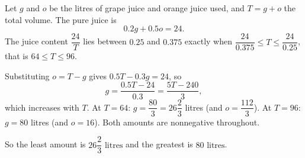 Let $g$ and $o$ be the litres of grape juice and orange juice used, and $T=g+o$ the total volume. The pure juice is
\[
0.2g+0.5o=24 .
\]
The juice content $\dfrac{24}{T}$ lies between $0.25$ and $0.375$ exactly when $\dfrac{24}{0.375}\le T\le\dfrac{24}{0.25}$, that is $64\le T\le96$.

Substituting $o=T-g$ gives $0.5T-0.3g=24$, so
\[
g=\dfrac{0.5T-24}{0.3}=\dfrac{5T-240}{3},
\]
which increases with $T$. At $T=64$: $g=\dfrac{80}{3}=26\dfrac{2}{3}$ litres (and $o=\dfrac{112}{3}$). At $T=96$: $g=80$ litres (and $o=16$). Both amounts are nonnegative throughout.

So the least amount is $\boxed{26\dfrac{2}{3}\text{ litres}}$ and the greatest is $\boxed{80\text{ litres}}$.
